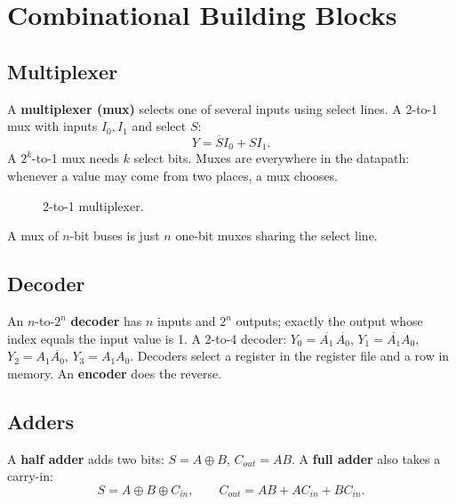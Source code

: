 \section{Combinational Building Blocks}

\subsection{Multiplexer}

A \textbf{multiplexer (mux)} selects one of several inputs using select
lines. A 2-to-1 mux with inputs $I_0, I_1$ and select $S$:
\[ Y = \overline{S} I_0 + S I_1. \]
A $2^k$-to-1 mux needs $k$ select bits. Muxes are everywhere in the
datapath: whenever a value may come from two places, a mux chooses.

\begin{figure}[H]
\centering
{}
\caption{2-to-1 multiplexer.}
\end{figure}

A mux of $n$-bit buses is just $n$ one-bit muxes sharing the select line.

\subsection{Decoder}

An $n$-to-$2^n$ \textbf{decoder} has $n$ inputs and $2^n$ outputs; exactly
the output whose index equals the input value is 1. A 2-to-4 decoder:
$Y_0 = \overline{A_1}\,\overline{A_0}$, $Y_1 = \overline{A_1}A_0$,
$Y_2 = A_1\overline{A_0}$, $Y_3 = A_1A_0$. Decoders select a register
in the register file and a row in memory. An \textbf{encoder} does the
reverse.

\subsection{Adders}

\begin{definition}
A \textbf{half adder} adds two bits: $S = A \oplus B$, $C_{out} = AB$.
A \textbf{full adder} also takes a carry-in:
\[
S = A \oplus B \oplus C_{in}, \qquad
C_{out} = AB + AC_{in} + BC_{in}.
\]
\end{definition}

